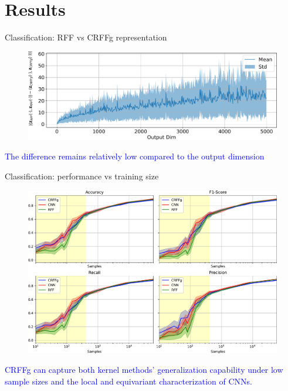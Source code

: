 \documentclass[aspectratio=169]{beamer}
\begin{document}
\section{Results}

\begin{frame}{Classification: RFF vs CRFFg representation}
    \begin{figure}
    \centering
    \includegraphics[width=1\linewidth]{Figures/rff_vs_crffg1.pdf}
\end{figure}

\begin{center}
\textcolor{blue}{The difference remains relatively low compared to the output dimension}    
\end{center}

\end{frame}


\begin{frame}{Classification: performance vs training size}


  \begin{minipage}[t]{0.64\textwidth}
    \begin{figure}
    \centering
    \includegraphics[width=1\linewidth]{Figures/acc_vs_data.pdf}
    \end{figure}
  \end{minipage}
  \hfill\begin{minipage}[t]{0.3\textwidth}
  \vspace{2cm}
    \begin{center}
        \textcolor{blue}{CRFFg can capture both kernel methods’ generalization capability under low sample sizes and the local and equivariant characterization of CNNs.}    
    \end{center}
    
  \end{minipage}
  
\end{frame}
\end{document}
